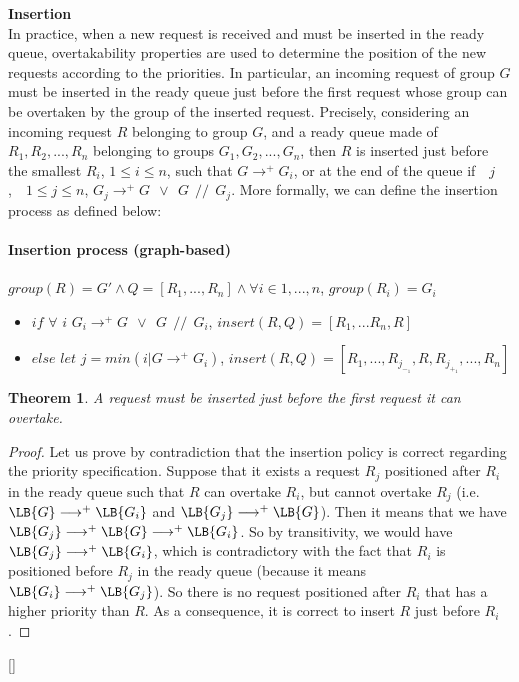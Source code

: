 \documentclass[11pt]{report}
\begin{document}
\textbf{Insertion}\\
In practice, when a new request is received and must be inserted in the ready queue, overtakability properties are used to determine the position of the new requests according to the priorities.
In particular, an incoming request of group $G$ must be inserted in the ready queue just before the first request whose group can be overtaken by the group of the inserted request. Precisely, 
considering an incoming request $R$ belonging to group $G$, and a ready queue made of $R_1,R_2,...,R_n$ belonging to groups $G_1,G_2,...,G_n$, then $R$ is inserted just before the smallest $R_i$, $1 \le i \le n$, such that $G\longrightarrow^{+}G_i$, or at the end of the queue if~\ \forall $j$,~\ $1 \le j \le n$,  $G_j\longrightarrow^{+}G~\ \vee~\ G~\ //~\ G_j$.
More formally, we can define the insertion process as defined below:
\paragraph{Insertion process (graph-based)}
$group(R)=G' \wedge Q=[R_1,...,R_n] \wedge \forall i \in 1,...,n$, $group(R_i)=G_i$
\begin{itemize}
\item $if$ $\forall$ $i$ $G_i\longrightarrow^{+}G~\ \vee~\ G~\ //~\ G_i$, $insert(R,Q)=[R_1,...R_n,R]$
\item $else$ $let$ $j=min({i|G\longrightarrow^{+}G_i})$, $insert(R, Q)=[R_1,...,R_j_-_1,R,R_j_+_1,...,R_n]$
\end{itemize} 

\newtheorem{insertion}{Theorem}
\begin{insertion}
A request must be inserted just before the first request it can overtake.
\end{insertion}
\begin{proof}[Proof]
Let us prove by contradiction that the insertion policy is correct regarding the priority specification.
Suppose that it exists a request $R_j$ positioned after  
$R_i$ in the ready queue such that $R$ can overtake $R_i$, but cannot overtake $R_j$ (i.e. $\LB{G}\longrightarrow^{+}\LB{G_i}$ and  $\LB{G_j}\longrightarrow^{+}\LB{G}$). Then it means that we have $\LB{G_j}\longrightarrow^{+}\LB{G}\longrightarrow^{+}\LB{G_i}$. So by transitivity, we would have $\LB{G_j}\longrightarrow^{+}\LB{G_i}$,
which is contradictory with the fact that $R_i$ is positioned before $R_j$ in the ready queue (because it means $\LB{G_i}\longrightarrow^{+}\LB{G_j}$). So there is no request positioned after $R_i$ that has a higher priority than $R$. As a consequence, it is correct to insert $R$ just before $R_i$.
\end{proof}[]
\end{document}
